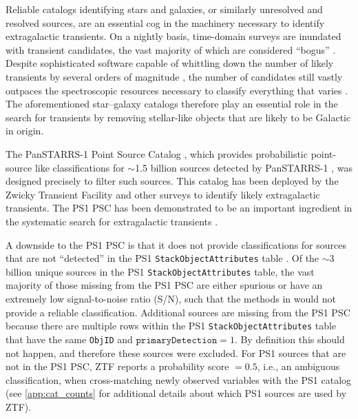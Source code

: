 \documentclass[twocolumn]{aastex63}
\begin{document}
Reliable catalogs identifying stars and galaxies, or similarly unresolved and
resolved sources, are an essential cog in the machinery necessary to identify
extragalactic transients. On a nightly basis, time-domain surveys are inundated
with transient candidates, the vast majority of which are considered ``bogus''
\citep[e.g.,][]{Bloom12}. Despite sophisticated software capable of whittling
down the number of likely transients by several orders of magnitude
\citep[e.g.,][]{Brink13,Goldstein15,Duev19,Smith20}, the number of candidates
still vastly outpaces the spectroscopic resources necessary to classify
everything that varies \citep[e.g.,][]{Kulkarni20}. The aforementioned
star--galaxy catalogs therefore play an essential role in the search for
transients by removing stellar-like objects that are likely to be Galactic in
origin.

The PanSTARRS-1 Point Source Catalog \citep[PS1 PSC;][]{Tachibana18}, which
provides probabilistic point-source like classifications for $\sim$1.5 billion
sources detected by PanSTARRS-1 \citep[PS1;][]{Chambers16}, was designed
precisely to filter such sources. This catalog has been deployed by the Zwicky
Transient Facility \citep[ZTF;][]{Bellm19} and other surveys
\citep{Smith20,Moller20} to identify likely extragalactic transients. The PS1
PSC has been demonstrated to be an important ingredient in the systematic
search for extragalactic transients \citep[e.g.,][]{Fremling20,De20}.

A downside to the PS1 PSC is that it does not provide classifications for
sources that are not ``detected'' in the PS1 \texttt{StackObjectAttributes}
table \citep[see \S3 in][]{Tachibana18}. Of the $\sim$3 billion unique sources
in the PS1 \texttt{StackObjectAttributes} table, the vast majority of those
missing from the PS1 PSC are either spurious or have an extremely low
signal-to-noise ratio (S/N), such that the methods in \citet{Tachibana18}
would not provide a reliable classification. Additional sources are missing
from the PS1 PSC because there are multiple rows within the PS1
\texttt{StackObjectAttributes} table that have the same \texttt{ObjID} and
$\mathtt{primaryDetection} = 1$. By definition this should not happen, and
therefore these sources were excluded. For PS1 sources that are not in the PS1
PSC, ZTF reports a probability score $=0.5$, i.e., an ambiguous
classification, when cross-matching newly observed variables with the PS1
catalog (see \ref{app:cat_counts} for additional details about which PS1
sources are used by ZTF).
\end{document}
